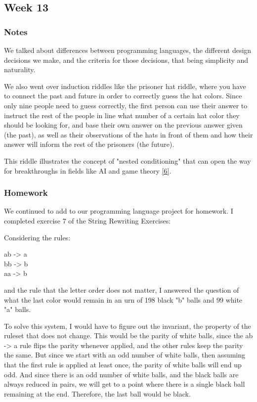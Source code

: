 \documentclass{article}
\theoremstyle{theorem}
\theoremstyle{definition}
\theoremstyle{remark}
\begin{document}
\subsection{Week 13}

\subsubsection{Notes}
We talked about differences between programming languages, the different design decisions we make, and the criteria for those decisions, that being simplicity and naturality. 

\hspace{0.65cm}We also went over induction riddles like the prisoner hat riddle, where you have to connect the past and future in order to correctly guess the hat colors. Since only nine people need to guess correctly, the first person can use their answer to instruct the rest of the people in line what 
number of a certain hat color they should be looking for, and base their own answer on the previous answer given (the past), as well as their observations of the hats in front of them and how their answer will inform the rest of the prisoners (the future). 

\hspace{0.65cm}This riddle illustrates the concept of "nested conditioning" that can open the way for breakthroughs in fields like AI and game theory \hyperref[6]{[6]}.

\subsubsection{Homework}
We continued to add to our programming language project for homework. I completed exercise 7 of the String Rewriting Exercises:

\hspace{0.65cm}Considering the rules: 

\begin{center}
  ab -> a \\
  bb -> b \\
  aa -> b\\
\end{center}
and the rule that the letter order does not matter, I answered the question of what the last color would remain in an urn of 198 black "b" balls and 99 white "a" balls.

\hspace{0.65cm}To solve this system, I would have to figure out the invariant, the property of the ruleset that does not change. This would be the parity of white balls, since the ab -> a rule flips the parity whenever applied, 
and the other rules keep the parity the same. But since we start with an odd number of white balls, then assuming that the first rule is applied at least once, the parity of white balls will end up odd. And since there is an odd number of white balls, and 
the black balls are always reduced in pairs, we will get to a point where there is a single black ball remaining at the end. Therefore, the last ball would be black.
\end{document}
